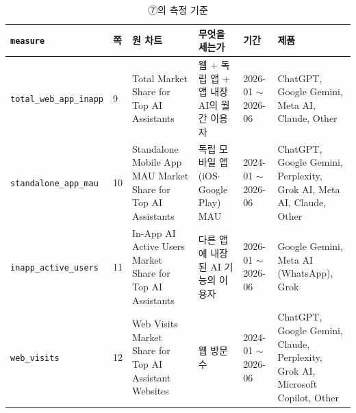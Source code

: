 \documentclass[11pt]{article}
\begin{document}
\begin{longtable}{L{3.0cm}L{0.6cm}L{3.6cm}L{3.2cm}L{2.0cm}L{3.2cm}}
\caption{⑦의 측정 기준}\label{tab:measures}\\
\toprule
\texttt{measure} & 쪽 & 원 차트 & 무엇을 세는가 & 기간 & 제품 \\
\midrule
\endhead
\texttt{total\_web\_app\_inapp} & 9 & Total Market Share for Top AI Assistants & 웹 + 독립 앱 + 앱 내장 AI의 월간 이용자 & 2026-01 $\sim$ 2026-06 & ChatGPT, Google Gemini, Meta AI, Claude, Other \\
\texttt{standalone\_app\_mau} & 10 & Standalone Mobile App MAU Market Share for Top AI Assistants & 독립 모바일 앱(iOS$\cdot$Google Play) MAU & 2024-01 $\sim$ 2026-06 & ChatGPT, Google Gemini, Perplexity, Grok AI, Meta AI, Claude, Other \\
\texttt{inapp\_active\_users} & 11 & In-App AI Active Users Market Share for Top AI Assistants & 다른 앱에 내장된 AI 기능의 이용자 & 2026-01 $\sim$ 2026-06 & Google Gemini, Meta AI (WhatsApp), Grok \\
\texttt{web\_visits} & 12 & Web Visits Market Share for Top AI Assistant Websites & 웹 방문 수 & 2024-01 $\sim$ 2026-06 & ChatGPT, Google Gemini, Claude, Perplexity, Grok AI, Microsoft Copilot, Other \\
\bottomrule
\end{longtable}
\end{document}
